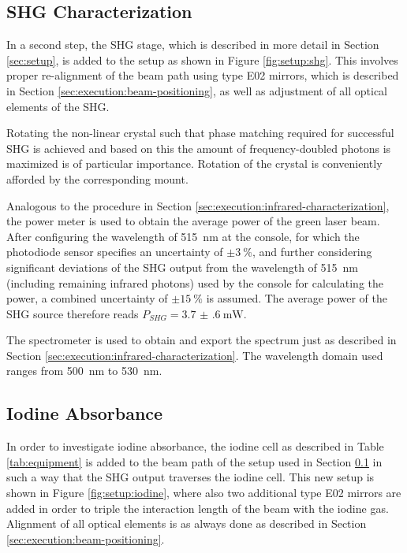 \subsection{SHG Characterization}
\label{sec:execution:shg-characterization}

In a second step, the SHG stage, which is described in more detail in Section \ref{sec:setup}, is added to the setup as shown in Figure \ref{fig:setup:shg}. This involves proper re-alignment of the beam path using type E02 mirrors, which is described in Section \ref{sec:execution:beam-positioning}, as well as adjustment of all optical elements of the SHG. 

Rotating the non-linear crystal such that phase matching required for successful SHG is achieved and based on this the amount of frequency-doubled photons is maximized is of particular importance. Rotation of the crystal is conveniently afforded by the corresponding mount.

Analogous to the procedure in Section \ref{sec:execution:infrared-characterization}, the power meter is used to obtain the average power of the green laser beam. After configuring the wavelength of \SI{515}{\nm} at the console, for which the photodiode sensor specifies an uncertainty of $\pm \SI{3}{\percent}$, and further considering significant deviations of the SHG output from the wavelength of \SI{515}{\nm} (including remaining infrared photons) used by the console for calculating the power, a combined uncertainty of $\pm \SI{15}{\percent}$ is assumed. The average power of the SHG source therefore reads $P_{SHG} = \SI{3.7(6)}{\mW}$.

The spectrometer is used to obtain and export the spectrum just as described in Section \ref{sec:execution:infrared-characterization}. The wavelength domain used ranges from \SI{500}{\nm} to \SI{530}{\nm}.

\subsection{Iodine Absorbance}
\label{sec:execution:iodine}

In order to investigate iodine absorbance, the iodine cell as described in Table \ref{tab:equipment} is added to the beam path of the setup used in Section \ref{sec:execution:shg-characterization} in such a way that the SHG output traverses the iodine cell. This new setup is shown in Figure \ref{fig:setup:iodine}, where also two additional type E02 mirrors are added in order to triple the interaction length of the beam with the iodine gas. Alignment of all optical elements is as always done as described in Section \ref{sec:execution:beam-positioning}. 

